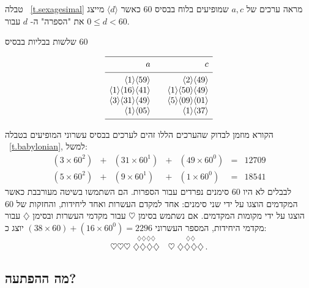 טבלה%
~\ref{t.sexagesimal}
מראה ערכים של
$a,c$
שמופיעים בלוח בבסיס
$60$
כאשר 
$\langle d\rangle$
מייצג את "הספרה" ה-%
$d$
עבור
$0\leq d<60$.
\begin{table}[t]
\caption{שלשות בבליות
בבסיס
$60$}\label{t.sexagesimal}
\vspace{-3ex}
\[
\begin{array}{r@{$\quad\quad$}r}
\hline
\noalign{\smallskip}
a&c\\
\noalign{\smallskip}\hline\noalign{\smallskip}
\langle 1\rangle \langle 59 \rangle&\langle 2\rangle \langle 49 \rangle\\
\langle 1\rangle \langle 16 \rangle\langle 41\rangle&\langle 1\rangle \langle 50 \rangle\langle 49\rangle\\
\langle 3\rangle \langle 31 \rangle\langle 49\rangle&\langle 5\rangle \langle 09 \rangle\langle 01\rangle\\
\langle 1\rangle \langle 05 \rangle&\langle 1\rangle \langle 37 \rangle\\
\noalign{\smallskip}\hline
\end{array}
\]
\vspace{-3ex}
\end{table}
הקורא מוזמן לבדוק שהערכים הללו זהים לערכים בבסיס עשרוני המופיעים בטבלה%
~\ref{t.babylonian},
למשל:
\[
\renewcommand{\arraystretch}{1.3}
\begin{array}{lclclcr}
(3\times 60^2) &+& (31\times 60^1) &+& (49\times 60^0) &=&   12709\\
(5\times 60^2) &+& (9\times 60^1) &+& (1\times 60^0) &=& 18541
\end{array}
\]
לבבלים לא היו
$60$
סימנים נפרדים עבור הספרות. הם השתמשו בשיטה מעורבבת כאשר המקדמים הוצגו על ידי שני סימנים: אחד למקדם העשרות ואחד ליחידות, והחזקות של $60$ הוצגו על ידי מקומות המקדמים.
אם נשתמש בסימן
$\heartsuit$
עבור מקדמי העשרות ובסימן
$\diamondsuit$ 
עבור מקדמי היחידות, המספר העשרוני
$(38\times 60)+(16\times 60^0)=2296$
יוצג כ:
\[
\heartsuit\heartsuit\heartsuit \; \stackrel{\displaystyle\diamondsuit\diamondsuit\diamondsuit\diamondsuit}{\diamondsuit\diamondsuit\diamondsuit\diamondsuit}
\quad
\heartsuit \; \stackrel{\displaystyle\diamondsuit\diamondsuit}{\diamondsuit\diamondsuit\diamondsuit\diamondsuit}\,.
\]


\subsection*{מה ההפתעה?}

